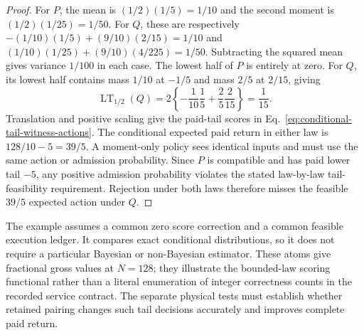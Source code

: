 \begin{proof}
For $P$, the mean is $(1/2)(1/5)=1/10$ and the second moment is
$(1/2)(1/25)=1/50$. For $Q$, these are respectively
$-(1/10)(1/5)+(9/10)(2/15)=1/10$ and
$(1/10)(1/25)+(9/10)(4/225)=1/50$.
Subtracting the squared mean gives variance $1/100$ in each case.
The lowest half of $P$ is entirely at zero. For $Q$, its lowest half
contains mass $1/10$ at $-1/5$ and mass $2/5$ at $2/15$, giving
\begin{equation}
 \operatorname{LT}_{1/2}(Q)
 =2\left\{-\frac1{10}\frac15+\frac25\frac2{15}\right\}
 =\frac1{15}.
\end{equation}
Translation and positive scaling give the paid-tail scores in
Eq.~\eqref{eq:conditional-tail-witness-actions}. The conditional
expected paid return in either law is $128/10-5=39/5$.
A moment-only policy sees identical inputs and must use the same action
or admission probability. Since $P$ is compatible and has paid lower
tail $-5$, any positive admission probability violates the stated
law-by-law tail-feasibility requirement. Rejection under both laws
therefore misses the feasible $39/5$ expected action under $Q$.
\end{proof}
The example assumes a common zero score correction and a common feasible
execution ledger. It compares exact conditional distributions, so it does
not require a particular Bayesian or non-Bayesian estimator. These atoms
give fractional gross values at $N=128$; they illustrate the bounded-law
scoring functional rather than a literal enumeration of integer
correctness counts in the recorded service contract. The separate
physical tests must establish whether retained pairing changes such
tail decisions accurately and improves complete paid return.
